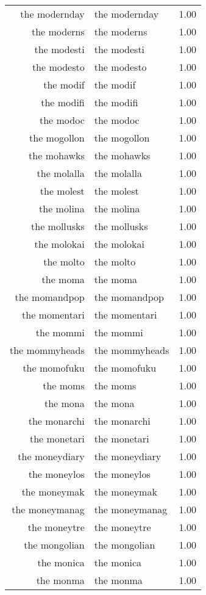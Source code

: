 \begin{table}[ht]
\begin{tabular}{rlr}
  the modernday & the modernday & 1.00 \\ 
  the moderns & the moderns & 1.00 \\ 
  the modesti & the modesti & 1.00 \\ 
  the modesto & the modesto & 1.00 \\ 
  the modif & the modif & 1.00 \\ 
  the modifi & the modifi & 1.00 \\ 
  the modoc & the modoc & 1.00 \\ 
  the mogollon & the mogollon & 1.00 \\ 
  the mohawks & the mohawks & 1.00 \\ 
  the molalla & the molalla & 1.00 \\ 
  the molest & the molest & 1.00 \\ 
  the molina & the molina & 1.00 \\ 
  the mollusks & the mollusks & 1.00 \\ 
  the molokai & the molokai & 1.00 \\ 
  the molto & the molto & 1.00 \\ 
  the moma & the moma & 1.00 \\ 
  the momandpop & the momandpop & 1.00 \\ 
  the momentari & the momentari & 1.00 \\ 
  the mommi & the mommi & 1.00 \\ 
  the mommyheads & the mommyheads & 1.00 \\ 
  the momofuku & the momofuku & 1.00 \\ 
  the moms & the moms & 1.00 \\ 
  the mona & the mona & 1.00 \\ 
  the monarchi & the monarchi & 1.00 \\ 
  the monetari & the monetari & 1.00 \\ 
  the moneydiary & the moneydiary & 1.00 \\ 
  the moneylos & the moneylos & 1.00 \\ 
  the moneymak & the moneymak & 1.00 \\ 
  the moneymanag & the moneymanag & 1.00 \\ 
  the moneytre & the moneytre & 1.00 \\ 
  the mongolian & the mongolian & 1.00 \\ 
  the monica & the monica & 1.00 \\ 
  the monma & the monma & 1.00 \\ 

\end{tabular}
\end{table}
